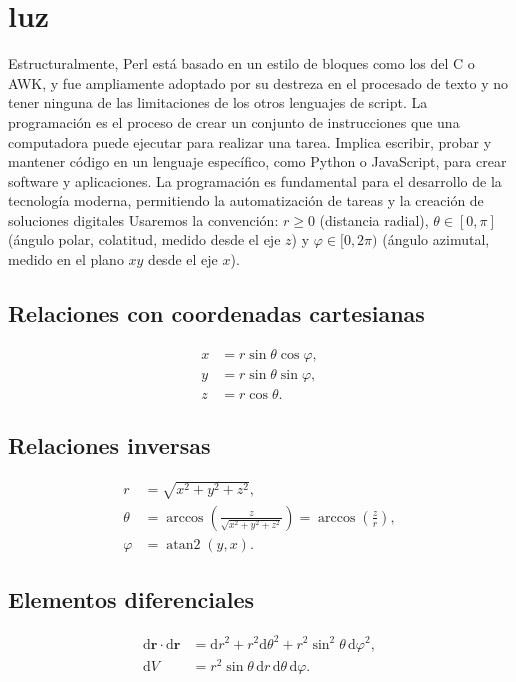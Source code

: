 \section{luz }  
Estructuralmente, Perl está basado en un estilo de bloques como los del C o AWK, y fue ampliamente adoptado por su destreza en el procesado de texto y no tener ninguna de las limitaciones de los otros lenguajes de script. La programación es el proceso de crear un conjunto de instrucciones que una computadora puede ejecutar para realizar una tarea. Implica escribir, probar y mantener código en un lenguaje específico, como Python o JavaScript, para crear software y aplicaciones. La programación es fundamental para el desarrollo de la tecnología moderna, permitiendo la automatización de tareas y la creación de soluciones digitales
Usaremos la convención: \(r\ge 0\) (distancia radial), \(\theta\in[0,\pi]\) (ángulo polar, colatitud, medido desde el eje \(z\)) y \(\varphi\in[0,2\pi)\) (ángulo azimutal, medido en el plano \(xy\) desde el eje \(x\)).

\subsection*{Relaciones con coordenadas cartesianas}
\begin{align}
x &= r \sin\theta \cos\varphi,\\
y &= r \sin\theta \sin\varphi,\\
z &= r \cos\theta.
\end{align}

\subsection*{Relaciones inversas}
\begin{align}
r &= \sqrt{x^2 + y^2 + z^2},\\
\theta &= \arccos\!\left(\frac{z}{\sqrt{x^2+y^2+z^2}}\right)
      = \arccos\!\left(\frac{z}{r}\right),\\
\varphi &= \operatorname{atan2}(y,x).
\end{align}

\subsection*{Elementos diferenciales}
\begin{align}
\mathrm{d}\mathbf{r}\cdot\mathrm{d}\mathbf{r} &= \mathrm{d}r^{2} + r^{2}\mathrm{d}\theta^{2} + r^{2}\sin^{2}\theta\,\mathrm{d}\varphi^{2},\\
\mathrm{d}V &= r^{2}\sin\theta\,\mathrm{d}r\,\mathrm{d}\theta\,\mathrm{d}\varphi.
\end{align}

